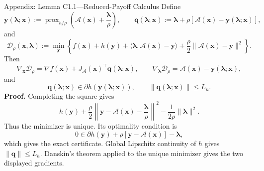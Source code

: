 \documentclass[handout,compress,9pt]{beamer}
\newcommand{\bx}{\bm{x}}
\newcommand{\by}{\bm{y}}
\newcommand{\bq}{\bm{q}}
\newcommand{\blmbd}{\bm{\lambda}}
\newcommand{\calA}{\mathcal{A}}
\newcommand{\prox}{\operatorname{prox}}
\begin{document}
\begin{frame}{Appendix: Lemma C1.1---Reduced-Payoff Calculus
\hfill\hyperlink{appendix:contents}{}}
\hypertarget{appendix:candidate-geometry}{}
\scriptsize
Define
\begin{equation*}
  \by(\blmbd;\bx):=\prox_{h/\rho}
  \left(\calA(\bx)+\frac{\blmbd}{\rho}\right),
  \qquad
  \bq(\blmbd;\bx):=\blmbd+\rho[\calA(\bx)-\by(\blmbd;\bx)],
\end{equation*}
and
\begin{equation*}
  \mathcal D_\rho(\bx,\blmbd)
  :=\min_{\by}\left\{f(\bx)+h(\by)
  +\langle\blmbd,\calA(\bx)-\by\rangle
  +\frac{\rho}{2}\|\calA(\bx)-\by\|^2\right\}.
\end{equation*}
Then
\begin{equation*}
  \nabla_{\bx}\mathcal D_\rho
  =\nabla f(\bx)+J_{\calA}(\bx)^\top\bq(\blmbd;\bx),
  \qquad
  \nabla_{\blmbd}\mathcal D_\rho
  =\calA(\bx)-\by(\blmbd;\bx),
\end{equation*}
and
\begin{equation*}
  \bq(\blmbd;\bx)\in\partial h(\by(\blmbd;\bx)),
  \qquad \|\bq(\blmbd;\bx)\|\le L_h.
\end{equation*}
\noindent\textbf{Proof.}
Completing the square gives
\begin{equation*}
  h(\by)+\frac{\rho}{2}
  \left\|\by-\calA(\bx)-\frac{\blmbd}{\rho}\right\|^2
  -\frac{1}{2\rho}\|\blmbd\|^2.
\end{equation*}
Thus the minimizer is unique.  Its optimality condition is
\begin{equation*}
  0\in\partial h(\by)+\rho[\by-\calA(\bx)]-\blmbd,
\end{equation*}
which gives the exact certificate.  Global Lipschitz continuity of $h$ gives
$\|\bq\|\le L_h$.  Danskin's theorem applied to the unique minimizer gives
the two displayed gradients.
\end{frame}
\end{document}
